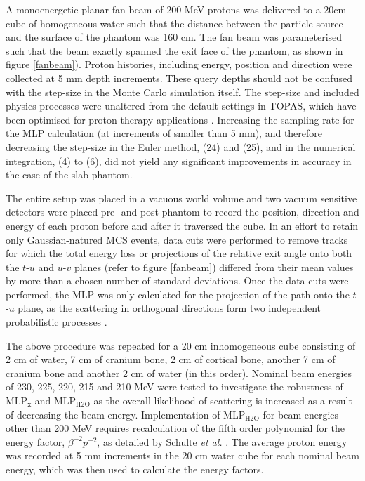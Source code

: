 \documentclass[preprint,times]{elsarticle}
\newcommand{\Fig}[1]{figure #1} %
\begin{document}
A monoenergetic planar fan beam of 200 MeV protons was delivered to a 20cm cube of homogeneous water such that the distance between the particle source and the surface of the phantom was 160 cm. The fan beam was parameterised such that the beam exactly spanned the exit face of the phantom, as shown in \Fig{\ref{fanbeam}}). Proton histories, including energy, position and direction were collected at 5 mm depth increments. These query depths should not be confused with the step-size in the Monte Carlo simulation itself. The step-size and included physics processes were unaltered from the default settings in TOPAS, which have been optimised for proton therapy applications \citep{Zacharatou08}. Increasing the sampling rate for the MLP calculation (at increments of smaller than 5 mm), and therefore decreasing the step-size in the Euler method, (24) and (25), and in the numerical integration, (4) to (6), did not yield any significant improvements in accuracy in the case of the slab phantom. 

The entire setup was placed in a vacuous world volume and two vacuum sensitive detectors were placed pre- and post-phantom to record the position, direction and energy of each proton before and after it traversed the cube. In an effort to retain only Gaussian-natured MCS events, data cuts were performed to remove tracks for which the total energy loss or projections of the relative exit angle onto both the $t$-$u$ and $u$-$v$ planes (refer to \Fig{\ref{fanbeam}}) differed from their mean values by more than a chosen number of standard deviations. Once the data cuts were performed, the MLP was only calculated for the projection of the path onto the $t$-$u$ plane, as the scattering in orthogonal directions form two independent probabilistic processes \citep{penfoldMLP}.

The above procedure was repeated for a 20 cm inhomogeneous cube consisting of 2 cm of water, 7 cm of cranium bone, 2 cm of cortical bone, another 7 cm of cranium bone and another 2 cm of water (in this order). Nominal beam energies of 230, 225, 220, 215 and 210 MeV were tested to investigate the robustness of MLP$_\mathrm{x}$ and MLP$_\mathrm{H2O}$ as the overall likelihood of scattering is increased as a result of decreasing the beam energy. Implementation of MLP${_\mathrm{H2O}}$ for beam energies other than 200 MeV requires recalculation of the fifth order polynomial for the energy factor, $\beta^{-2}p^{-2}$, as detailed by Schulte \emph{et al.} \citep{penfoldMLP}. The average proton energy was recorded at 5 mm increments in the 20 cm water cube for each nominal beam energy, which was then used to calculate the energy factors.
\end{document}
